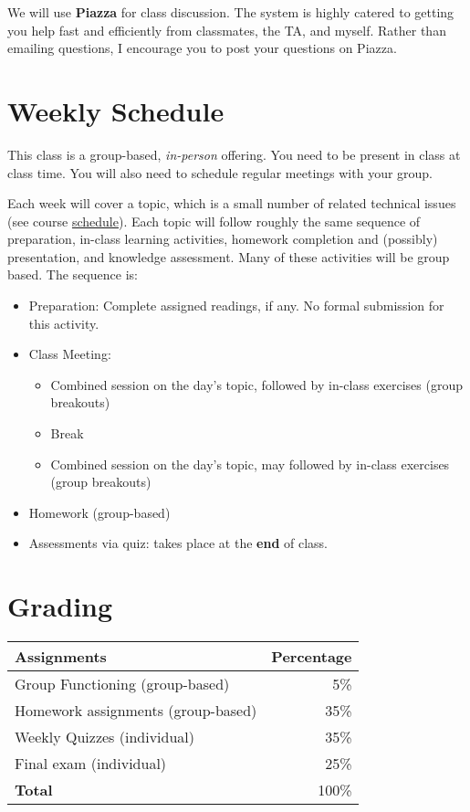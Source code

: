 \documentclass[11pt]{article}
\begin{document}
We will use \textbf{Piazza} for class discussion. The system is highly catered to getting you help fast and efficiently from classmates, the TA, and myself. Rather than emailing questions, I encourage you to post your questions on Piazza. 

\section{Weekly Schedule}

This class is a group-based, \emph{in-person} offering. You need to be
present in class at class time. You will also need to schedule regular
meetings with your group.

Each week will cover a topic, which is a small number of related
technical issues (see course \href{https://nguyenthanhvuh.github.io/class-oo/assignments}{schedule}). Each
topic will follow roughly the same sequence of preparation, in-class
learning activities, homework completion and (possibly) presentation,
and knowledge assessment. Many of these activities will be group based.
The sequence is:

\begin{itemize}
\item
  Preparation: Complete assigned readings, if
  any. No formal submission for this activity.
\item
  Class Meeting:

  \begin{itemize}
  \item
    Combined session on the day's topic, followed by
    in-class exercises (group breakouts)
  \item
    Break
  \item
    Combined session on the day's topic, may followed by
    in-class exercises (group breakouts)
  \end{itemize}
\item
  Homework (group-based)
\item
  Assessments via quiz: takes place at the \textbf{end} of class.
\end{itemize}

\section{Grading}\label{sec:grading}

\begin{center}
\begin{tabular}{lr}
\textbf{Assignments} & \textbf{Percentage} \\
\hline
Group Functioning (group-based) & 5\% \\
Homework assignments (group-based) & 35\% \\
Weekly Quizzes (individual) & 35\% \\
  Final exam (individual) & 25\% \\
  \hline
    \textbf{Total} & 100\% \\
\end{tabular}
\end{center}
\end{document}
